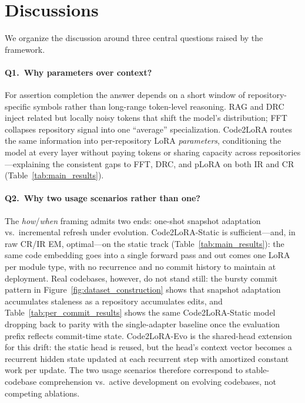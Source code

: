 \documentclass[11pt]{article}
\newcommand{\codelora}{Code2LoRA\xspace}
\newcommand{\codelorastatic}{\codelora-Static\xspace}
\newcommand{\codeloraevo}{\codelora-Evo\xspace}
\begin{document}
\section{Discussions}
\label{sec:discussion}

We organize the discussion around three central questions raised by the framework.

\paragraph{Q1.\ Why parameters over context?}
For assertion completion the answer depends on a short window of repository-specific symbols rather than long-range token-level reasoning.
RAG and DRC inject related but locally noisy tokens that shift the model's distribution; FFT collapses repository signal into one ``average'' specialization.
\codelora{} routes the same information into per-repository LoRA \emph{parameters}, conditioning the model at every layer without paying tokens or sharing capacity across repositories---explaining the consistent gaps to FFT, DRC, and pLoRA on both IR and CR (Table~\ref{tab:main_results}).

\paragraph{Q2.\ Why two usage scenarios rather than one?}
The \emph{how}/\emph{when} framing admits two ends: one-shot snapshot adaptation vs.\ incremental refresh under evolution.
\codelorastatic{} is sufficient---and, in raw CR/IR EM, optimal---on the static track (Table~\ref{tab:main_results}): the same code embedding goes into a single forward pass and out comes one LoRA per module type, with no recurrence and no commit history to maintain at deployment.
Real codebases, however, do not stand still: the bursty commit pattern in Figure~\ref{fig:dataset_construction} shows that snapshot adaptation accumulates staleness as a repository accumulates edits, and Table~\ref{tab:per_commit_results} shows the same \codelorastatic{} model dropping back to parity with the single-adapter baseline once the evaluation prefix reflects commit-time state.
\codeloraevo{} is the shared-head extension for this drift: the static head is reused, but the head's context vector becomes a recurrent hidden state updated at each recurrent step with amortized constant work per update.
The two usage scenarios therefore correspond to stable-codebase comprehension vs.\ active development on evolving codebases, not competing ablations.
\end{document}
